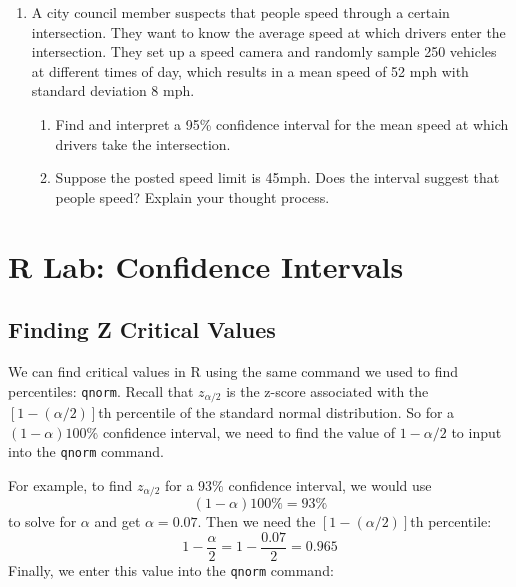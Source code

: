 \documentclass[
]{book}
\providecommand{\tightlist}{%
  \setlength{\itemsep}{0pt}\setlength{\parskip}{0pt}}
\begin{document}
\begin{enumerate}
  \begin{enumerate}
  \def\labelenumii{\alph{enumii}.}
  \tightlist
  \item
    Should we use a z or a t critical value in this setting? Explain.
  \item
    Find and interpret a 95\% confidence interval for mean commute time.
  \item
    Find and interpret a 90\% confidence interval for mean commute time.
  \end{enumerate}
\item
  A city council member suspects that people speed through a certain intersection. They want to know the average speed at which drivers enter the intersection. They set up a speed camera and randomly sample 250 vehicles at different times of day, which results in a mean speed of 52 mph with standard deviation 8 mph.

  \begin{enumerate}
  \def\labelenumii{\alph{enumii}.}
  \tightlist
  \item
    Find and interpret a 95\% confidence interval for the mean speed at which drivers take the intersection.
  \item
    Suppose the posted speed limit is 45mph. Does the interval suggest that people speed? Explain your thought process.
  \end{enumerate}
\end{enumerate}

\section*{R Lab: Confidence Intervals}\label{r-lab-confidence-intervals}

\subsection*{Finding Z Critical Values}\label{finding-z-critical-values}

We can find critical values in R using the same command we used to find percentiles: \texttt{qnorm}. Recall that \(z_{\alpha/2}\) is the z-score associated with the \([1-(\alpha/2)]\)th percentile of the standard normal distribution. So for a \((1-\alpha)100\%\) confidence interval, we need to find the value of \(1-\alpha/2\) to input into the \texttt{qnorm} command.

For example, to find \(z_{\alpha/2}\) for a 93\% confidence interval, we would use \[(1-\alpha)100\% = 93\%\] to solve for \(\alpha\) and get \(\alpha = 0.07\). Then we need the \([1-(\alpha/2)]\)th percentile: \[1-\frac{\alpha}{2} = 1 - \frac{0.07}{2} = 0.965\] Finally, we enter this value into the \texttt{qnorm} command:
\end{document}
